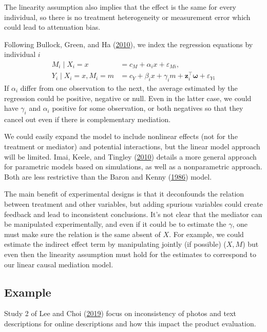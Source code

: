 \documentclass[
  11pt,
  letterpaper,
]{scrbook}
\theoremstyle{definition}
\theoremstyle{remark}
\begin{document}
The linearity assumption also implies that the effect is the same for
every individual, so there is no treatment heterogeneity or measurement
error which could lead to attenuation bias.

Following Bullock, Green, and Ha
(\protect\hyperlink{ref-Bullock.Green.Ha:2010}{2010}), we index the
regression equations by individual \(i\) \begin{align*}
M_i\mid X_i=x &= c_M + \alpha_i x + \varepsilon_{Mi},\\
Y_i \mid X_i=x, M_i=m &=  c_Y + \beta_i x + \gamma_i m + \mathbf{z}_i^\top\boldsymbol{\omega} + \varepsilon_{Yi}
\end{align*} If \(\alpha_i\) differ from one observation to the next,
the average estimated by the regression could be positive, negative or
null. Even in the latter case, we could have \(\gamma_i\) and
\(\alpha_i\) positive for some observation, or both negatives so that
they cancel out even if there is complementary mediation.

We could easily expand the model to include nonlinear effects (not for
the treatment or mediator) and potential interactions, but the linear
model approach will be limited. Imai, Keele, and Tingley
(\protect\hyperlink{ref-Imai:2010}{2010}) details a more general
approach for parametric models based on simulations, as well as a
nonparametric approach. Both are less restrictive than the Baron and
Kenny (\protect\hyperlink{ref-Baron.Kenny:1986}{1986}) model.

The main benefit of experimental designs is that it deconfounds the
relation between treatment and other variables, but adding spurious
variables could create feedback and lead to inconsistent conclusions.
It's not clear that the mediator can be manipulated experimentally, and
even if it could be to estimate the \(\gamma\), one must make sure the
relation is the same absent of \(X\). For example, we could estimate the
indirect effect term by manipulating jointly (if possible) (\(X, M\))
but even then the linearity assumption must hold for the estimates to
correspond to our linear causal mediation model.

\hypertarget{example}{%
\subsection{Example}\label{example}}

Study 2 of Lee and Choi (\protect\hyperlink{ref-Lee.Choi:2019}{2019})
focus on inconsistency of photos and text descriptions for online
descriptions and how this impact the product evaluation.
\end{document}

